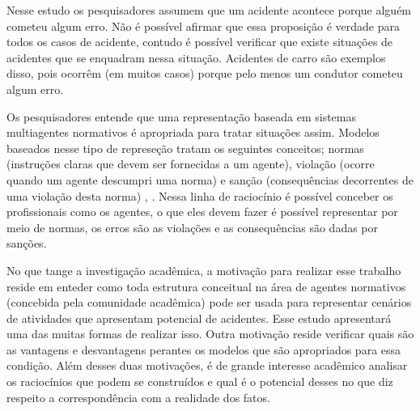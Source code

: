 Nesse estudo os pesquisadores assumem que um acidente acontece porque alguém cometeu algum erro. Não é possível afirmar que essa proposição é verdade para todos os casos de acidente, contudo é possível verificar que existe situações de acidentes que se enquadram nessa situação. Acidentes de carro são exemplos disso, pois ocorrêm (em muitos casos) porque pelo menos um condutor cometeu algum erro. 

Os pesquisadores entende que uma representação baseada em sistemas multiagentes normativos é apropriada para tratar situações assim. Modelos baseados nesse tipo de represeção tratam os seguintes conceitos; normas (instruções claras que devem ser fornecidas a um agente), violação (ocorre quando um agente descumpri uma norma) e sanção (consequências decorrentes de uma violação desta norma) \cite{dastaniframework} \cite{amodelmultiagentsystemdynamicrelationship}, \cite{ontologynormative}. Nessa linha de raciocínio é possível conceber os profissionais como os agentes, o que eles devem fazer é possível representar por meio de normas, os erros são as violações e as consequências são dadas por sanções.  

No que tange a investigação acadêmica, a motivação para realizar esse trabalho reside em enteder como toda estrutura conceitual na área de agentes normativos (concebida pela comunidade acadêmica) pode ser usada para representar cenários de atividades que apresentam potencial de acidentes. Esse estudo apresentará uma das muitas formas de realizar isso. Outra motivação reside verificar quais são as vantagens e desvantagens perantes os modelos que são apropriados para essa condição. Além desses duas motivações, é de grande interesse acadêmico analisar os raciocínios que podem se construídos e qual é o potencial desses no que diz respeito a correspondência com a realidade dos fatos. 